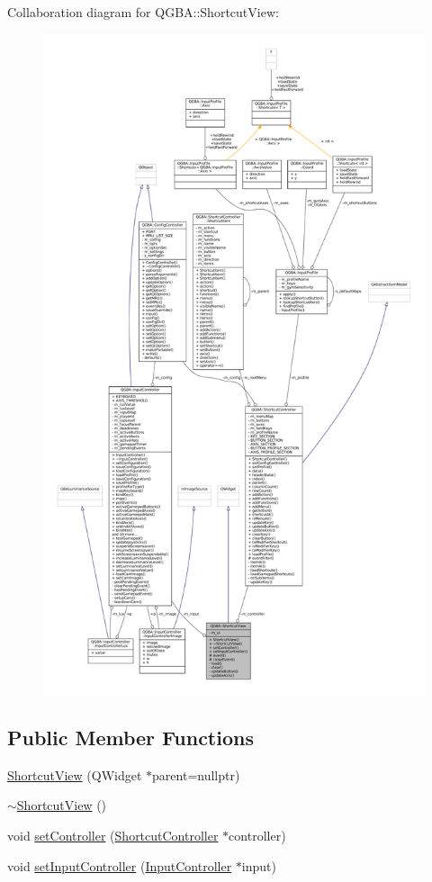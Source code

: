 Collaboration diagram for Q\+G\+BA\+:\+:Shortcut\+View\+:
\nopagebreak
\begin{figure}[H]
\begin{center}
\leavevmode
\includegraphics[height=550pt]{class_q_g_b_a_1_1_shortcut_view__coll__graph}
\end{center}
\end{figure}
\subsection*{Public Member Functions}
\begin{DoxyCompactItemize}
\item 
\mbox{\hyperlink{class_q_g_b_a_1_1_shortcut_view_ae275368545754152b2ef0e0a420d9785}{Shortcut\+View}} (Q\+Widget $\ast$parent=nullptr)
\item 
\mbox{\hyperlink{class_q_g_b_a_1_1_shortcut_view_ab8db5a97fc30078a806845506defc2b9}{$\sim$\+Shortcut\+View}} ()
\item 
void \mbox{\hyperlink{class_q_g_b_a_1_1_shortcut_view_ac69c7db087732d1795178c39f094ff93}{set\+Controller}} (\mbox{\hyperlink{class_q_g_b_a_1_1_shortcut_controller}{Shortcut\+Controller}} $\ast$controller)
\item 
void \mbox{\hyperlink{class_q_g_b_a_1_1_shortcut_view_a66fea4a2af2c2f1aac50b5a29d931fb1}{set\+Input\+Controller}} (\mbox{\hyperlink{class_q_g_b_a_1_1_input_controller}{Input\+Controller}} $\ast$input)
\end{DoxyCompactItemize}
